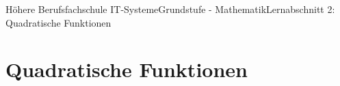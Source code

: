 \documentclass[11pt,twocolumn,oneside,openany,headings=optiontotoc,11pt,numbers=noenddot]{article}
\begin{document}
	\begin{worksheet}{Höhere Berufsfachschule IT-Systeme}{Grundstufe - Mathematik}{Lernabschnitt 2: Quadratische Funktionen}
		\section{Quadratische Funktionen}
	\end{worksheet}
\end{document}
